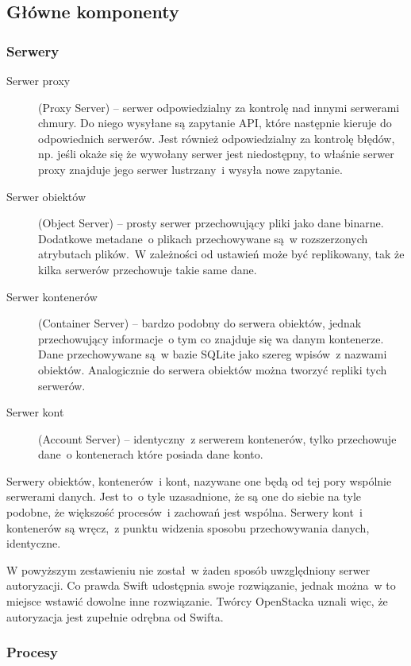 \subsection{Główne komponenty}\label{sub:glowne komponenty}

\subsubsection{Serwery}\label{sub:serwery}

\begin{description}
\item[Serwer proxy] (Proxy Server) -- serwer odpowiedzialny za kontrolę nad innymi serwerami chmury. Do niego wysyłane są zapytanie API, które następnie kieruje do odpowiednich serwerów. Jest również odpowiedzialny za kontrolę błędów, np. jeśli okaże się że wywołany serwer jest niedostępny, to właśnie serwer proxy znajduje jego serwer lustrzany~i wysyła nowe zapytanie.
\item[Serwer obiektów] (Object Server) -- prosty serwer przechowujący pliki jako dane binarne. Dodatkowe metadane~o plikach przechowywane są~w rozszerzonych atrybutach plików.~W zależności od ustawień może być replikowany, tak że kilka serwerów przechowuje takie same dane.
\item[Serwer kontenerów] (Container Server) -- bardzo podobny do serwera obiektów, jednak przechowujący informacje~o tym co znajduje się wa danym kontenerze. Dane przechowywane są~w bazie SQLite jako szereg wpisów~z nazwami obiektów. Analogicznie do serwera obiektów można tworzyć repliki tych serwerów.
\item[Serwer kont] (Account Server) -- identyczny~z serwerem kontenerów, tylko przechowuje dane~o kontenerach które posiada dane konto.
\end{description}

Serwery obiektów, kontenerów~i kont, nazywane one będą od tej pory wspólnie serwerami danych. Jest to~o tyle uzasadnione, że są one do siebie na tyle podobne, że większość procesów~i zachowań jest wspólna. Serwery kont~i kontenerów są wręcz,~z punktu widzenia sposobu przechowywania danych, identyczne.

W powyższym zestawieniu nie został~w żaden sposób uwzględniony serwer autoryzacji. Co prawda Swift udostępnia swoje rozwiązanie, jednak można~w to miejsce wstawić dowolne inne rozwiązanie. Twórcy OpenStacka uznali więc, że autoryzacja jest zupełnie odrębna od Swifta.

\subsubsection{Procesy}\label{sub:procesy}

